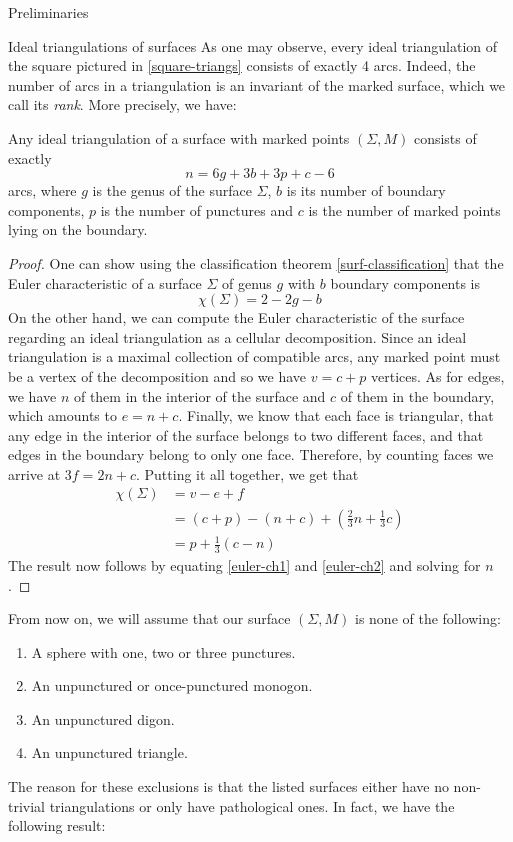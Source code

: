 \begin{chapter}{Preliminaries}
\begin{section}{Ideal triangulations of surfaces}
As one may observe, every ideal triangulation of the square pictured in \ref{square-triangs} consists of exactly 4 arcs. Indeed, the number of arcs in a triangulation is an invariant of the marked surface, which we call its \emph{rank}. More precisely, we have:

\begin{prop} Any ideal triangulation of a surface with marked points $(\Sigma, M)$ consists of exactly
\[
n=6g+3b+3p+c-6
\]
arcs, where $g$ is the genus of the surface $\Sigma$, $b$ is its number of boundary components, $p$ is the number of punctures and $c$ is the number of marked points lying on the boundary.
\end{prop}
\begin{proof} One can show using the classification theorem \ref{surf-classification} that the Euler characteristic of a surface $\Sigma$ of genus $g$ with $b$ boundary components is
\begin{equation}\label{euler-ch1}
\chi(\Sigma)=2-2g-b
\end{equation}
On the other hand, we can compute the Euler characteristic of the surface regarding an ideal triangulation as a cellular decomposition. Since an ideal triangulation is a maximal collection of compatible arcs, any marked point must be a vertex of the decomposition and so we have $v = c + p$ vertices. As for edges, we have $n$ of them in the interior of the surface and $c$ of them in the boundary, which amounts to $e = n + c$. Finally, we know that each face is triangular, that any edge in the interior of the surface belongs to two different faces, and that edges in the boundary belong to only one face. Therefore, by counting faces we arrive at $3f = 2n+c$. Putting it all together, we get that
\[
\begin{aligned}\label{euler-ch2}
\chi(\Sigma)&=v-e+f\\
&=(c+p)-(n+c)+\left(\frac{2}{3}n+\frac{1}{3} c\right)\\
&=p+\frac{1}{3}(c-n)
\end{aligned}
\]
The result now follows by equating \eqref{euler-ch1} and \eqref{euler-ch2} and solving for $n$.
\end{proof}

From now on, we will assume that our surface $(\Sigma, M)$ is none of the following:
\begin{enumerate}
\item A sphere with one, two or three punctures.
\item An unpunctured or once-punctured monogon.
\item An unpunctured digon.
\item An unpunctured triangle.
\end{enumerate}
The reason for these exclusions is that the listed surfaces either have no non-trivial triangulations or only have pathological ones. In fact, we have the following result:


\end{section}
\end{chapter}
